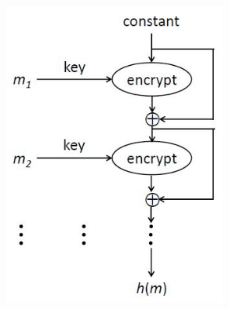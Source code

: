 \begin{figure}
	\begin{center}
	{\includegraphics[height=10cm, width=10cm, keepaspectratio]{Immagini/Capitolo4/schema_des_come_hash_2.JPG}}
	\end{center}
\end{figure}


